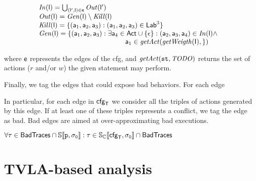 $$
\begin{array}{l}
\cfunction{In}(\cel{l}) = \bigcup_{(\cel{l'}, \cel{l}) \in \cel{e}} \cfunction{Out}(\cel{l'})\\
\cfunction{Out}(\cel{l}) = \cfunction{Gen}(\cel{l}) \setminus \cfunction{Kill}(\cel{l}) \\
\cfunction{Kill}(\cel{l}) = \{(\cel{a}_1, \cel{a}_2, \cel{a}_3) : (\cel{a}_1, \cel{a}_2, \cel{a}_3) \in \labels^3\}\\
\cfunction{Gen}(\cel{l}) = \{(\cel{a}_1, \cel{a}_2, \cel{a}_3) : \exists \cel{a}_4 \in \actions \cup \{\epsilon\}: (\cel{a}_2, \cel{a}_3, \cel{a}_4) \in \cfunction{In}(\cel{l}) \land\\
\hspace{125pt} \cel{a}_1 \in \getaction{\cfunction{getWeigth}(\cel{I})} \}
\end{array}
$$

where $\mathsf{e}$ represents the edges of the cfg, and $\mathit{getAct(\mathtt{st}, TODO)}$ returns the set of actions ($r$ and/or $w$) the given statement may perform.

Finally, we tag the edges that could expose bad behaviors. For each edge 


In particular, for each edge in $\mathsf{cfg}_{\mathsf{T}}$ we consider all the triples of actions generated by this edge. If at least one of these triples represents a conflict, we tag the edge as bad.
Bad edges are aimed at over-approximating bad executions.

\begin{theorem}
$\forall \tau \in \mathsf{BadTraces} \cap \mathbb{S}\llbracket \mathtt{\mathtt{p}, \sigma_0} \rrbracket : \tau \in \mathbb{S_C}\llbracket \mathtt{\mathsf{cfg}_{\mathsf{T}}, \sigma_0} \rrbracket \cap \mathsf{BadTraces}$
\end{theorem}




\section{TVLA-based analysis}

